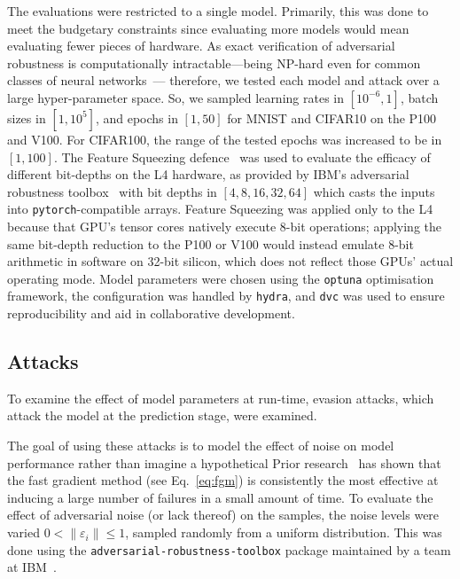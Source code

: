 \documentclass[conference]{IEEEtran}%
\begin{document}
The evaluations were restricted to a single model. 
Primarily, this was done to meet the budgetary constraints since evaluating more models would mean evaluating fewer pieces of hardware. 
As exact verification of adversarial robustness is computationally intractable---being NP-hard even for common classes of neural networks~\cite{carlini_towards_2017,ruan2019global}--- therefore, we tested each model and attack over a large hyper-parameter space.
So, we sampled learning rates in $[10^{-6}, 1]$, batch sizes in $[1, 10^5]$, and epochs in $[1, 50]$ for MNIST and CIFAR10 on the P100 and V100. For CIFAR100, the range of the tested epochs was increased to be in $[1, 100]$. 
The Feature Squeezing defence~\cite{feature_squeezing} was used to evaluate the efficacy of different bit-depths on the L4 hardware, as provided by IBM's adversarial robustness toolbox~\cite{art2018} with bit depths in $[4,8,16,32,64]$ which casts the inputs into \texttt{pytorch}-compatible arrays. 
Feature Squeezing was applied only to the L4 because that GPU's tensor cores natively execute 8-bit operations; applying the same bit-depth reduction to the P100 or V100 would instead emulate 8-bit arithmetic in software on 32-bit silicon, which does not reflect those GPUs' actual operating mode.
Model parameters were chosen using the \texttt{optuna} optimisation framework, the configuration was handled by \texttt{hydra}, and \texttt{dvc} was used to ensure reproducibility and aid in collaborative development.


\subsection{Attacks}

To examine the effect of model parameters at run-time, evasion attacks, which attack the model at the prediction stage, were examined.

The goal of using these attacks is to model the effect of noise on model performance rather than imagine a hypothetical 
Prior research~\cite{meyers,meyers_aft} has shown that the fast gradient method (see Eq.~\ref{eq:fgm}) is consistently the most effective at inducing a large number of failures in a small amount of time.
To evaluate the effect of adversarial noise (or lack thereof) on the samples, the noise levels were varied $0 < \|\varepsilon_i\| \leq 1$, sampled randomly from a uniform distribution.
This was done using the \texttt{adversarial-robustness-toolbox} package maintained by a team at IBM~\cite{art2018}.
\end{document}
